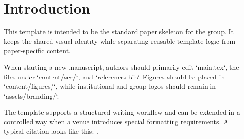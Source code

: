 \section{Introduction}

This template is intended to be the standard paper skeleton for the group. It keeps the shared visual identity while separating reusable template logic from paper-specific content.

When starting a new manuscript, authors should primarily edit `main.tex`, the files under `content/sec/`, and `references.bib`. Figures should be placed in `content/figures/`, while institutional and group logos should remain in `assets/branding/`.

The template supports a structured writing workflow and can be extended in a controlled way when a venue introduces special formatting requirements. A typical citation looks like this: \citep{lamport1994latex}.
